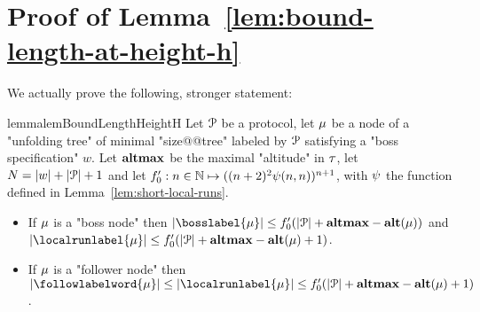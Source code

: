 \section{Proof of Lemma~\ref{lem:bound-length-at-height-h}}
\label{app:bound-node-size-with-altitude}

\lemBoundLengthHeightH*

We actually prove the following, stronger statement:
\begin{restatable}{lemma}{lemBoundLengthHeightH}
	\label{lem:bound-length-at-height-h-extended}
	Let $\mathcal{P}$ be a protocol, let $\mu$ be a node of a "unfolding tree" of minimal "size@@tree" labeled by $\mathcal{P}$ satisfying a "boss specification" $w$.
	Let $\mathbf{altmax}$ be the maximal "altitude" in $\tau$, let $N = |w| + |\mathcal{P}| +1$ and let $f_0' : n \in \mathbb{N} \mapsto ((n+2)^2 \psi(n,n))^{n+1}$, with $\psi$ the function defined in Lemma~\ref{lem:short-local-runs}.
	
	\begin{itemize}
		\item If $\mu$ is a "boss node" then $\size{\bosslabel{\node}} \leq f_0'(\size{\prot} +\altmax - \altitude{\node})$ and $\size{\localrunlabel{\node}} \leq f_0'(\size{\prot} +\altmax - \altitude{\node}+1)$.
		
		\item If $\mu$ is a "follower node" then $\size{\followlabelword{\node}} \leq \size{\localrunlabel{\node}} \leq f_0'(\size{\prot} + \altmax - \altitude{\node}+1)$.
	\end{itemize} 
\end{restatable}
